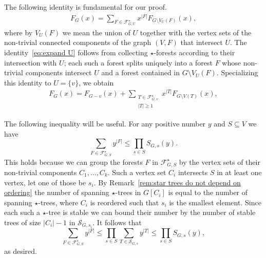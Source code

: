 \documentclass[a4paper,11pt,reqno]{amsart}
\numberwithin{equation}{section}
\begin{document}
The following identity is fundamental for our proof.
\begin{align}\label{eq:expand U}
F_{G}(x)=\sum_{F\in \mathcal{F}^\star_{G,U}}x^{|F|}F_{G\setminus V_U(F)}(x),
\end{align}
where by $V_U(F)$ we mean the union of $U$ together with the vertex sets of the non-trivial connected components of the graph $(V,F)$ that intersect $U$.
The identity~\eqref{eq:expand U} follows from collecting $\star$-forests according to their intersection with $U$; each such a forest splits uniquely into a forest $F$ whose non-trivial components intersect $U$ and a forest contained in $G\setminus V_U(F)$.
Specializing this identity to $U=\{v\}$, %
we obtain
\begin{align}\label{eq:fundamental recurrence}
F_{G}(x)=F_{G-v}(x)+\sum_{\substack{T\in \mathcal{F}^\star_{G,v} \\ |T|\geq 1}}x^{|T|}F_{G\setminus V(T)}(x),
\end{align}

The following inequality will be useful. 
For any positive number $y$ and $S\subseteq V$ we have
\begin{equation}
\label{eq:Forest-to-tree}
    \sum_{F \in \mathcal{F}^\star_{G,S}}y^{|F|} \leq \prod_{s \in S}S_{G,s}(y).
\end{equation}
This holds because we can group the forests $F$ in $\mathcal{F}^\star_{G,S}$ by the vertex sets of their non-trivial components  $C_1,\ldots,C_k$. 
Such a vertex set $C_i$ intersects $S$ in at least one vertex, let one of those be $s_i$.
By Remark~\ref{rem:star trees do not depend on ordering} the number of spanning $\star$-trees in $G[C_i]$ is equal to the number of spanning $\star$-trees, where $C_i$ is reordered such that $s_i$ is the smallest element.
Since each such a $\star$-tree is stable we can bound their number by the number of stable trees of size $|C_i|-1$ in $\mathcal{S}_{G,s_i}$.
It follows that \[
\sum_{F \in \mathcal{F}^\star_{G,S}}y^{|F|} \leq \prod_{s \in S} \sum_{T \in \mathcal{S}_{G,s}}y^{|T|}\leq \prod_{s \in S}S_{G,s}(y),\]
as desired.
\end{document}

